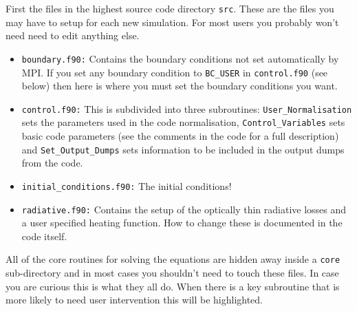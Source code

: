 \documentclass[11pt]{article}
\begin{document}
First the files in the highest source code directory \texttt{src}. These are the files you may have to setup for each 
new simulation. For most users you probably won't need need to edit anything else.
\begin{itemize}

 \item{\texttt{boundary.f90:}} Contains the boundary conditions not set automatically by MPI. If you set any boundary 
 condition to \texttt{BC\_USER} in \texttt{control.f90} (see below) then here is where you must set the boundary 
 conditions you want.

  \item{\texttt{control.f90:}} This is subdivided into three subroutines: \texttt{User\_Normalisation} sets the 
  parameters used in the code normalisation, \texttt{Control\_Variables} sets basic code parameters  (see the 
  comments in the code for a full description) and
\texttt{Set\_Output\_Dumps} sets information to be included in the output dumps from the code.

  \item{\texttt{initial\_conditions.f90:}} The initial conditions!

  \item{\texttt{radiative.f90:}} Contains the setup of the optically thin radiative losses and a user specified
  heating function. How to change these is documented in the code itself.

\end{itemize}

All of the core routines for solving the equations are hidden away inside a \texttt{core} sub-directory and in most 
cases you shouldn't need to touch these files. In case you are curious this is what they all do. When there is a key 
subroutine that is more likely to need user intervention this will be highlighted.
\end{document}
